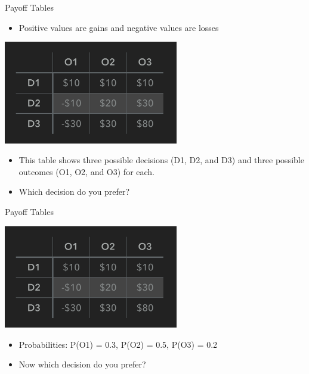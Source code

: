 \documentclass{beamer}\usepackage[]{graphicx}\usepackage[]{color}
\begin{document}
\begin{darkframes}
    \begin{frame}[fragile]{Payoff Tables}
      \fontsize{10}{10}\selectfont  
      \begin{itemize}
            \item Positive values are gains and negative values are losses
        \end{itemize}
        \begin{center}
          \includegraphics[width=3in]{PayoffTable} 
        \end{center}
        \begin{itemize}
            \item This table shows three possible decisions (D1, D2, and D3) and three
            possible outcomes (O1, O2, and O3) for each.
            \item Which decision do you prefer?
        \end{itemize}

      \lc %
    \end{frame}


    \begin{frame}[fragile]{Payoff Tables}
      \fontsize{10}{10}\selectfont  
      \begin{center}
        \includegraphics[width=3in]{PayoffTable} 
      \end{center}
        \begin{itemize}
            \item Probabilities: P(O1) = 0.3, P(O2) = 0.5, P(O3) = 0.2
            \item Now which decision do you prefer?
        \end{itemize}


\end{frame}
\end{darkframes}
\end{document}
